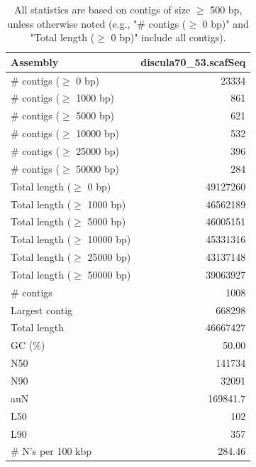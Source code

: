 \documentclass[12pt,a4paper]{article}
\begin{document}
\begin{table}[ht]
\begin{center}
\caption{All statistics are based on contigs of size $\geq$ 500 bp, unless otherwise noted (e.g., "\# contigs ($\geq$ 0 bp)" and "Total length ($\geq$ 0 bp)" include all contigs).}
\begin{tabular}{|l*{1}{|r}|}
\hline
Assembly & discula70\_53.scafSeq \\ \hline
\# contigs ($\geq$ 0 bp) & 23334 \\ \hline
\# contigs ($\geq$ 1000 bp) & 861 \\ \hline
\# contigs ($\geq$ 5000 bp) & 621 \\ \hline
\# contigs ($\geq$ 10000 bp) & 532 \\ \hline
\# contigs ($\geq$ 25000 bp) & 396 \\ \hline
\# contigs ($\geq$ 50000 bp) & 284 \\ \hline
Total length ($\geq$ 0 bp) & 49127260 \\ \hline
Total length ($\geq$ 1000 bp) & 46562189 \\ \hline
Total length ($\geq$ 5000 bp) & 46005151 \\ \hline
Total length ($\geq$ 10000 bp) & 45331316 \\ \hline
Total length ($\geq$ 25000 bp) & 43137148 \\ \hline
Total length ($\geq$ 50000 bp) & 39063927 \\ \hline
\# contigs & 1008 \\ \hline
Largest contig & 668298 \\ \hline
Total length & 46667427 \\ \hline
GC (\%) & 50.00 \\ \hline
N50 & 141734 \\ \hline
N90 & 32091 \\ \hline
auN & 169841.7 \\ \hline
L50 & 102 \\ \hline
L90 & 357 \\ \hline
\# N's per 100 kbp & 284.46 \\ \hline
\end{tabular}
\end{center}
\end{table}
\end{document}
